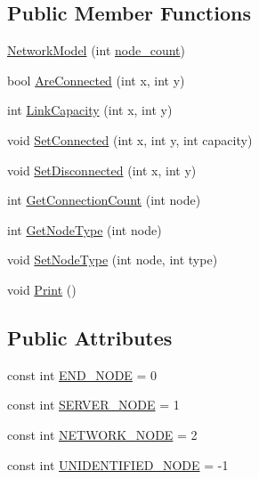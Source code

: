 \subsection*{Public Member Functions}
\begin{DoxyCompactItemize}
\item 
\hyperlink{classNetTrafficSimulator_1_1NetworkModel_a271752106d40e56f0f55def7f0e1bf0d}{Network\-Model} (int \hyperlink{classNetTrafficSimulator_1_1NetworkModel_a85f9941bb3af088bd078b273f0cb4e52}{node\-\_\-count})
\item 
bool \hyperlink{classNetTrafficSimulator_1_1NetworkModel_a5d2d13396e4df9e45146b8a7f02a9b67}{Are\-Connected} (int x, int y)
\item 
int \hyperlink{classNetTrafficSimulator_1_1NetworkModel_aeb2db05cbda72d2e220fe53550e4d598}{Link\-Capacity} (int x, int y)
\item 
void \hyperlink{classNetTrafficSimulator_1_1NetworkModel_a32b086f665dbacb1ce48c244b28d6d3a}{Set\-Connected} (int x, int y, int capacity)
\item 
void \hyperlink{classNetTrafficSimulator_1_1NetworkModel_acf61bc6091630b26455868a2575d34c7}{Set\-Disconnected} (int x, int y)
\item 
int \hyperlink{classNetTrafficSimulator_1_1NetworkModel_ae32e3d246753b51152124af9df9372ee}{Get\-Connection\-Count} (int node)
\item 
int \hyperlink{classNetTrafficSimulator_1_1NetworkModel_a3d8f3112c2cc4b21fe8070a0896652fa}{Get\-Node\-Type} (int node)
\item 
void \hyperlink{classNetTrafficSimulator_1_1NetworkModel_ac8457d8aa77448caa2212020f48eec20}{Set\-Node\-Type} (int node, int type)
\item 
void \hyperlink{classNetTrafficSimulator_1_1NetworkModel_a724d036cf0dbadefaba005aa853630be}{Print} ()
\end{DoxyCompactItemize}
\subsection*{Public Attributes}
\begin{DoxyCompactItemize}
\item 
const int \hyperlink{classNetTrafficSimulator_1_1NetworkModel_a1335e5ee160345ac2f849998d94f2934}{E\-N\-D\-\_\-\-N\-O\-D\-E} = 0
\item 
const int \hyperlink{classNetTrafficSimulator_1_1NetworkModel_a9f536ecef65ce9ef55b52afa90ae8438}{S\-E\-R\-V\-E\-R\-\_\-\-N\-O\-D\-E} = 1
\item 
const int \hyperlink{classNetTrafficSimulator_1_1NetworkModel_ab2882fa4fe981780f78f822b12677f88}{N\-E\-T\-W\-O\-R\-K\-\_\-\-N\-O\-D\-E} = 2
\item 
const int \hyperlink{classNetTrafficSimulator_1_1NetworkModel_a6736303b5919398aef63238c6436fe9c}{U\-N\-I\-D\-E\-N\-T\-I\-F\-I\-E\-D\-\_\-\-N\-O\-D\-E} = -\/1
\end{DoxyCompactItemize}
